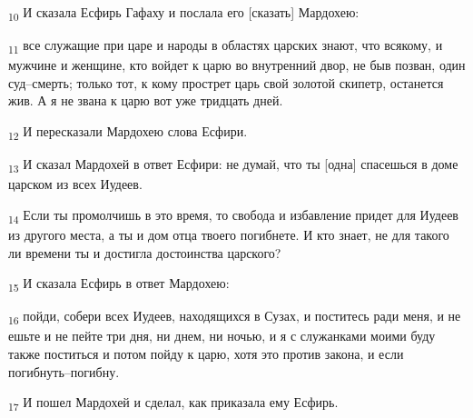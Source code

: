\begin{tcolorbox}
\textsubscript{10} И сказала Есфирь Гафаху и послала его [сказать] Мардохею:
\end{tcolorbox}
\begin{tcolorbox}
\textsubscript{11} все служащие при царе и народы в областях царских знают, что всякому, и мужчине и женщине, кто войдет к царю во внутренний двор, не быв позван, один суд--смерть; только тот, к кому прострет царь свой золотой скипетр, останется жив. А я не звана к царю вот уже тридцать дней.
\end{tcolorbox}
\begin{tcolorbox}
\textsubscript{12} И пересказали Мардохею слова Есфири.
\end{tcolorbox}
\begin{tcolorbox}
\textsubscript{13} И сказал Мардохей в ответ Есфири: не думай, что ты [одна] спасешься в доме царском из всех Иудеев.
\end{tcolorbox}
\begin{tcolorbox}
\textsubscript{14} Если ты промолчишь в это время, то свобода и избавление придет для Иудеев из другого места, а ты и дом отца твоего погибнете. И кто знает, не для такого ли времени ты и достигла достоинства царского?
\end{tcolorbox}
\begin{tcolorbox}
\textsubscript{15} И сказала Есфирь в ответ Мардохею:
\end{tcolorbox}
\begin{tcolorbox}
\textsubscript{16} пойди, собери всех Иудеев, находящихся в Сузах, и поститесь ради меня, и не ешьте и не пейте три дня, ни днем, ни ночью, и я с служанками моими буду также поститься и потом пойду к царю, хотя это против закона, и если погибнуть--погибну.
\end{tcolorbox}
\begin{tcolorbox}
\textsubscript{17} И пошел Мардохей и сделал, как приказала ему Есфирь.
\end{tcolorbox}
